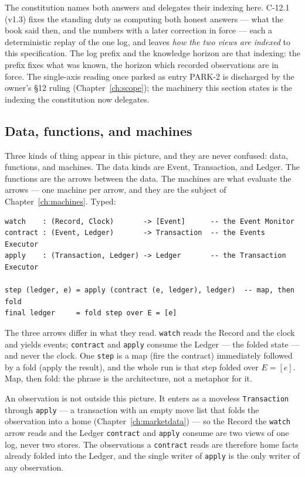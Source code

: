\documentclass[11pt,a4paper]{article}
\begin{document}
The constitution names both answers and delegates their indexing here. C-12.1 (v1.3) fixes
the standing duty as computing both honest answers --- what the book said then, and the
numbers with a later correction in force --- each a deterministic replay of the one log, and
leaves \emph{how the two views are indexed} to this specification. The log prefix and the
knowledge horizon are that indexing: the prefix fixes what was known, the horizon which
recorded observations are in force. The single-axis reading once parked as entry PARK-2 is
discharged by the owner's \S 12 ruling (Chapter~\ref{ch:scope}); the machinery this section
states is the indexing the constitution now delegates.

\subsection{Data, functions, and machines}

Three kinds of thing appear in this picture, and they are never confused: data,
functions, and machines. The data kinds are Event, Transaction, and Ledger. The functions are
the arrows between the data. The machines are what evaluate the arrows --- one machine per
arrow, and they are the subject of Chapter~\ref{ch:machines}. Typed:

\begin{lstlisting}
watch    : (Record, Clock)       -> [Event]      -- the Event Monitor
contract : (Event, Ledger)       -> Transaction  -- the Events Executor
apply    : (Transaction, Ledger) -> Ledger       -- the Transaction Executor

step (ledger, e) = apply (contract (e, ledger), ledger)  -- map, then fold
final ledger     = fold step over E = [e]
\end{lstlisting}

The three arrows differ in what they read. \texttt{watch} reads the Record and the clock
and yields events; \texttt{contract} and \texttt{apply} consume the Ledger --- the folded
state --- and never the clock. One \texttt{step} is a map (fire the contract) immediately
followed by a fold (apply the result), and the whole run is that step folded over
$E=[e]$. Map, then fold: the phrase is the architecture, not a metaphor for it.

An observation is not outside this picture. It enters as a moveless
\texttt{Transaction} through \texttt{apply} --- a transaction with an empty move list
that folds the observation into a home (Chapter~\ref{ch:marketdata}) --- so the Record
the \texttt{watch} arrow reads and the Ledger \texttt{contract} and \texttt{apply}
consume are two views of one log, never two stores. The observations a \texttt{contract}
reads are therefore home facts already folded into the Ledger, and the single writer of
\texttt{apply} is the only writer of any observation.
\end{document}
